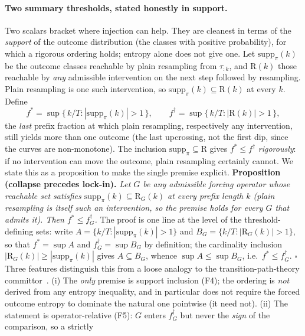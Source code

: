 \documentclass[11pt]{article}
\begin{document}
\paragraph{Two summary thresholds, stated honestly in support.}
Two scalars bracket where injection can help. They are cleanest in terms of the
\emph{support} of the outcome distribution (the classes with positive probability),
for which a rigorous ordering holds; entropy alone does not give one. Let
$\mathrm{supp}_\pi(k)$ be the outcome classes reachable by plain resampling from
$\tau_{:k}$, and $\mathrm{R}(k)$ those reachable by \emph{any} admissible
intervention on the next step followed by resampling. Plain resampling is one such
intervention, so $\mathrm{supp}_\pi(k)\subseteq \mathrm{R}(k)$ at every $k$. Define
\begin{equation}
f^\ast=\sup\{\,k/T : |\mathrm{supp}_\pi(k)|>1\,\},\qquad
f^\dagger=\sup\{\,k/T : |\mathrm{R}(k)|>1\,\},
\end{equation}
the \emph{last} prefix fraction at which plain resampling, respectively any
intervention, still yields more than one outcome (the last upcrossing, not the first
dip, since the curves are non-monotone). The inclusion
$\mathrm{supp}_\pi\subseteq\mathrm{R}$ gives $f^\ast\le f^\dagger$
\emph{rigorously}: if no intervention can move the outcome, plain resampling
certainly cannot. We state this as a proposition to make the single premise
explicit. \textbf{Proposition (collapse precedes lock-in).} \emph{Let $G$ be any
admissible forcing operator whose reachable set satisfies
$\mathrm{supp}_\pi(k)\subseteq\mathrm{R}_G(k)$ at every prefix length $k$ (plain
resampling is itself such an intervention, so the premise holds for every $G$ that
admits it). Then $f^\ast\le f^\dagger_G$.} The proof is one line at the level of the
threshold-defining sets: write $A=\{k/T:|\mathrm{supp}_\pi(k)|>1\}$ and
$B_G=\{k/T:|\mathrm{R}_G(k)|>1\}$, so that $f^\ast=\sup A$ and
$f^\dagger_G=\sup B_G$ by definition; the cardinality inclusion
$|\mathrm{R}_G(k)|\ge|\mathrm{supp}_\pi(k)|$ gives $A\subseteq B_G$, whence
$\sup A\le\sup B_G$, i.e.\ $f^\ast\le f^\dagger_G$. $\square$ Three features
distinguish this from a loose analogy to the transition-path-theory
committor~\citep{evanden2010tpt}. (i) The \emph{only} premise is support
inclusion (F4); the ordering is \emph{not} derived from any entropy inequality, and
in particular does not require the forced outcome entropy to dominate the natural
one pointwise (it need not). (ii) The statement is operator-relative (F5): $G$
enters $f^\dagger_G$ but never the \emph{sign} of the comparison, so a strictly
\end{document}
